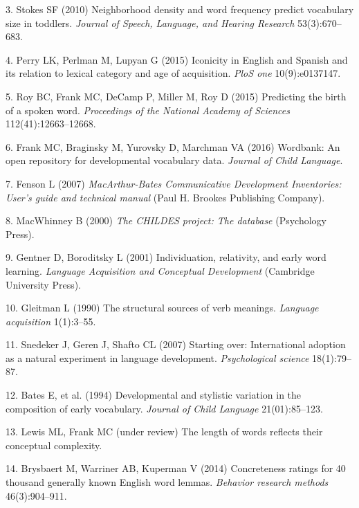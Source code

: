 \documentclass[9pt,twocolumn,twoside]{pnas-new}
\begin{document}
\hypertarget{ref-stokes2010}{}
3. Stokes SF (2010) Neighborhood density and word frequency predict
vocabulary size in toddlers. \emph{Journal of Speech, Language, and
Hearing Research} 53(3):670--683.

\hypertarget{ref-perry2015}{}
4. Perry LK, Perlman M, Lupyan G (2015) Iconicity in English and Spanish
and its relation to lexical category and age of acquisition. \emph{PloS
one} 10(9):e0137147.

\hypertarget{ref-roy2015}{}
5. Roy BC, Frank MC, DeCamp P, Miller M, Roy D (2015) Predicting the
birth of a spoken word. \emph{Proceedings of the National Academy of
Sciences} 112(41):12663--12668.

\hypertarget{ref-frank2016}{}
6. Frank MC, Braginsky M, Yurovsky D, Marchman VA (2016) Wordbank: An
open repository for developmental vocabulary data. \emph{Journal of
Child Language}.

\hypertarget{ref-fenson2007}{}
7. Fenson L (2007) \emph{MacArthur-Bates Communicative Development
Inventories: User's guide and technical manual} (Paul H. Brookes
Publishing Company).

\hypertarget{ref-macwhinney2000}{}
8. MacWhinney B (2000) \emph{The CHILDES project: The database}
(Psychology Press).

\hypertarget{ref-gentner2001}{}
9. Gentner D, Boroditsky L (2001) Individuation, relativity, and early
word learning. \emph{Language Acquisition and Conceptual Development}
(Cambridge University Press).

\hypertarget{ref-gleitman1990}{}
10. Gleitman L (1990) The structural sources of verb meanings.
\emph{Language acquisition} 1(1):3--55.

\hypertarget{ref-snedeker2007}{}
11. Snedeker J, Geren J, Shafto CL (2007) Starting over: International
adoption as a natural experiment in language development.
\emph{Psychological science} 18(1):79--87.

\hypertarget{ref-bates1994}{}
12. Bates E, et al. (1994) Developmental and stylistic variation in the
composition of early vocabulary. \emph{Journal of Child Language}
21(01):85--123.

\hypertarget{ref-lewisunderreview}{}
13. Lewis ML, Frank MC (under review) The length of words reflects their
conceptual complexity.

\hypertarget{ref-brysbaert2014}{}
14. Brysbaert M, Warriner AB, Kuperman V (2014) Concreteness ratings for
40 thousand generally known English word lemmas. \emph{Behavior research
methods} 46(3):904--911.
\end{document}
